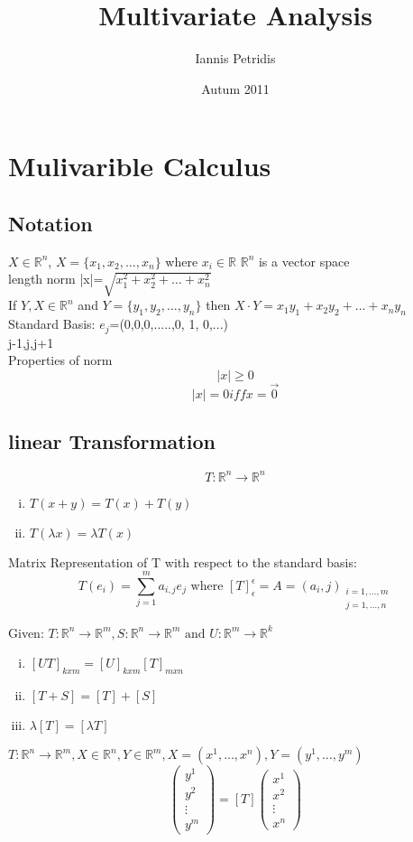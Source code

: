 \documentclass[12pt]{article}
\def\RR{\mathbb{R}}
\begin{document}
\title{Multivariate Analysis}
\author{Iannis Petridis}
\date{Autum 2011}
\maketitle

\section{Mulivarible  Calculus}
\subsection{Notation}
$X\in\RR^{n}$, $ X=\{x_{1},x_{2},\dots,x_{n}\}$ where $x_{i}\in\RR$
$\RR^{n}$ is a vector space\\
length norm |x|=$\sqrt{x_1^2 + x_2^2 + \dots +x_n^2 }$\\
If $Y,X\in\RR^{n}$ and $ Y=\{y_{1},y_{2},\dots,y_{n}\}$ then $X \cdot Y=x_{1}y_{1}+ x_{2}y_{2} +\dots + x_{n}y_{n}$\\
Standard Basis: $e_j$=(0,0,0,.....,0, 1, 0,...)\\
\mbox{j-1,j,j+1}\\
Properties of norm
\[|x|\geq0\]
\[|x|=0 iff x=\vec{0}\]


\subsection{linear Transformation}
\[T:\RR^{n}\rightarrow\RR^{n}\]
\begin{enumerate}[(i)]
\item $T(x+y)=T(x) + T(y)$
\item $ T(\lambda x) =\lambda T(x) $
\end{enumerate}
Matrix Representation of T with respect to the standard basis:\\
\[T(e_i)=\sum_{j=1}^{m}a_{i,j}e_j \textrm{ where } [T]_{\epsilon}^{\epsilon}=A=(a_i,j)_{\substack{i=1,\dots ,m \\ j=1,\dots ,n}}\]

Given: $T:\RR^{n}\rightarrow\RR^{m}, S:\RR^{n}\rightarrow\RR^{m} \textrm{ and } U:\RR^{m}\rightarrow\RR^{k}$
\begin{enumerate}[(i)]
\item $ [UT]_{kxm}=[U]_{kxm}[T]_{mxn}$
\item $[T+S]=[T]+[S]$
\item $\lambda[T]=[\lambda T]$
\end{enumerate}
$T:\RR^{n}\rightarrow\RR^{m}, X\in \RR^{n}, Y\in \RR^{m}, X=(x^{1},\dots ,x^{n}), Y=(y^{1},\dots ,y^{m})$\\
\[  \left(\! \begin{array}{c} y^{1} \\ y^{2}\\ \vdots\\ y^{m} \end{array}\! \right) = [T] \left(\! \begin{array}{c} x^{1} \\ x^{2}\\ \vdots\\ x^{n} \end{array}\! \right) \]
\end{document}
